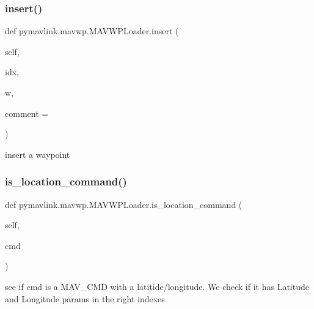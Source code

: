 \subsubsection{\texorpdfstring{insert()}{insert()}}
{\footnotesize\ttfamily def pymavlink.\+mavwp.\+M\+A\+V\+W\+P\+Loader.\+insert (\begin{DoxyParamCaption}\item[{}]{self,  }\item[{}]{idx,  }\item[{}]{w,  }\item[{}]{comment = {\ttfamily \textquotesingle{}\textquotesingle{}} }\end{DoxyParamCaption})}

\begin{DoxyVerb}insert a waypoint\end{DoxyVerb}
 \mbox{\label{classpymavlink_1_1mavwp_1_1MAVWPLoader_a658e38dfc8136515b4a20c602f2cdd48}} 
\subsubsection{\texorpdfstring{is\+\_\+location\+\_\+command()}{is\_location\_command()}}
{\footnotesize\ttfamily def pymavlink.\+mavwp.\+M\+A\+V\+W\+P\+Loader.\+is\+\_\+location\+\_\+command (\begin{DoxyParamCaption}\item[{}]{self,  }\item[{}]{cmd }\end{DoxyParamCaption})}

\begin{DoxyVerb}see if cmd is a MAV_CMD with a latitide/longitude.
We check if it has Latitude and Longitude params in the right indexes\end{DoxyVerb}
 \mbox{\label{classpymavlink_1_1mavwp_1_1MAVWPLoader_a8a7cd99d440f8a7ac8cb2892d07b900b}} 
